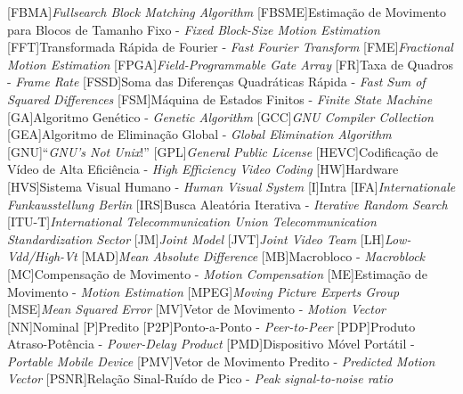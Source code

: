 \begin{acronym}
[FBMA]{\textit{Fullsearch Block Matching Algorithm}}
[FBSME]{Estimação de Movimento para Blocos de Tamanho Fixo - \textit{Fixed Block-Size Motion Estimation}}
[FFT]{Transformada Rápida de Fourier - \textit{Fast Fourier Transform}}
[FME]{\textit{Fractional Motion Estimation}}
[FPGA]{\textit{Field-Programmable Gate Array}}
[FR]{Taxa de Quadros - \textit{Frame Rate}}
[FSSD]{Soma das Diferenças Quadráticas Rápida - \textit{Fast Sum of Squared Differences}}
[FSM]{Máquina de Estados Finitos - \textit{Finite State Machine}}
[GA]{Algoritmo Genético - \textit{Genetic Algorithm}}
[GCC]{\textit{GNU Compiler Collection}}
[GEA]{Algoritmo de Eliminação Global - \textit{Global Elimination Algorithm}}
[GNU]{``\textit{GNU's Not Unix}!''}
[GPL]{\textit{General Public License}}
[HEVC]{Codificação de Vídeo de Alta Eficiência - \textit{High Efficiency Video Coding}}
[HW]{Hardware}
[HVS]{Sistema Visual Humano - \textit{Human Visual System}}
[I]{Intra}
[IFA]{\textit{Internationale Funkausstellung Berlin}}
[IRS]{Busca Aleatória Iterativa - \textit{Iterative Random Search}}
[ITU-T]{\textit{International Telecommunication Union Telecommunication Standardization Sector}}
[JM]{\textit{Joint Model}}
[JVT]{\textit{Joint  Video Team}}
[LH]{\textit{Low-Vdd/High-Vt}}
[MAD]{\textit{Mean Absolute Difference}}
[MB]{Macrobloco - \textit{Macroblock}}
[MC]{Compensação de Movimento - \textit{Motion Compensation}}
[ME]{Estimação de Movimento - \textit{Motion Estimation}}
[MPEG]{\textit{Moving Picture Experts Group}}
[MSE]{\textit{Mean Squared Error}}
[MV]{Vetor de Movimento - \textit{Motion Vector}}
[NN]{Nominal}
[P]{Predito}
[P2P]{Ponto-a-Ponto - \textit{Peer-to-Peer}}
[PDP]{Produto Atraso-Potência - \textit{Power-Delay Product}}
[PMD]{Dispositivo Móvel Portátil - \textit{Portable Mobile Device}}
[PMV]{Vetor de Movimento Predito - \textit{Predicted Motion Vector}}
[PSNR]{Relação Sinal-Ruído de Pico - \textit{Peak signal-to-noise ratio}}

\end{acronym}

